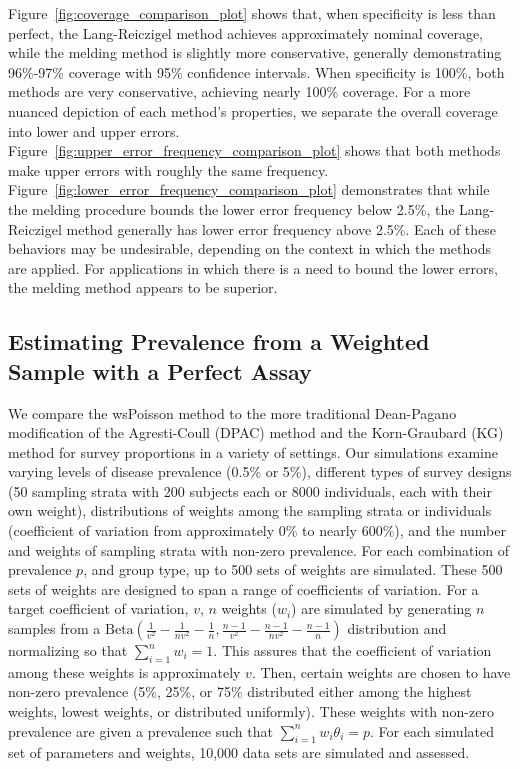 Figure~\ref{fig:coverage_comparison_plot} shows that, when specificity is less than perfect, the Lang-Reiczigel method achieves approximately nominal coverage, while the melding method is slightly more conservative, generally demonstrating 96\%-97\% coverage with 95\% confidence intervals.
When specificity is 100\%, both methods are very conservative, achieving nearly 100\% coverage.
For a more nuanced depiction of each method's properties, we separate the overall coverage into lower and upper errors.
Figure~\ref{fig:upper_error_frequency_comparison_plot} shows that both methods make upper errors with roughly the same frequency.
Figure~\ref{fig:lower_error_frequency_comparison_plot} demonstrates that while the melding procedure bounds the lower error frequency below 2.5\%, the Lang-Reiczigel method generally has lower error frequency above 2.5\%.
Each of these behaviors may be undesirable, depending on the context in which the methods are applied.
For applications in which there is a need to bound the lower errors, the melding method appears to be superior.


\subsection{Estimating Prevalence from a Weighted Sample with a Perfect Assay}
\label{sim-perfect}
We compare the wsPoisson method to the more traditional Dean-Pagano modification of the Agresti-Coull (DPAC) method and the Korn-Graubard (KG) method for survey proportions in a variety of settings.
Our simulations examine varying levels of disease prevalence (0.5\% or 5\%), different types of survey designs (50 sampling strata with 200 subjects each or 8000 individuals, each with their own weight), distributions of weights among the sampling strata or individuals (coefficient of variation from approximately 0\% to nearly 600\%), and the number and weights of sampling strata with non-zero prevalence.
For each combination of prevalence \( p \), and group type, up to 500 sets of weights are simulated.
These 500 sets of weights are designed to span a range of coefficients of variation.
For a target coefficient of variation, \( v \), \( n \) weights (\(w_i\)) are simulated by generating \( n \) samples from a \( \text{Beta} \left(\frac{1}{v^2} - \frac{1}{nv^2} - \frac{1}{n}, \frac{n-1}{v^2} - \frac{n-1}{nv^2} - \frac{n-1}{n} \right) \) distribution and normalizing so that \( \sum_{i=1}^n w_i = 1 \).
This assures that the coefficient of variation among these weights is approximately \( v \).
Then, certain weights are chosen to have non-zero prevalence (5\%, 25\%, or 75\% distributed either among the highest weights, lowest weights, or distributed uniformly).
These weights with non-zero prevalence are given a prevalence such that \( \sum_{i=1}^n w_i \theta_i = p \).
For each simulated set of parameters and weights, 10,000 data sets are simulated and assessed.

